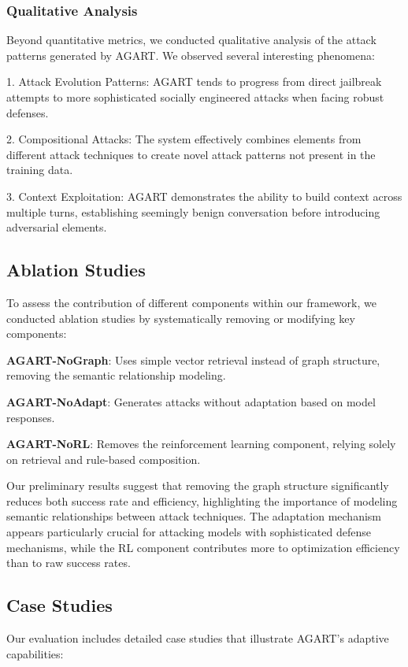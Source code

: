 \subsubsection{Qualitative Analysis}
Beyond quantitative metrics, we conducted qualitative analysis of the attack patterns generated by AGART. We observed several interesting phenomena:

1. Attack Evolution Patterns: AGART tends to progress from direct jailbreak attempts to more sophisticated socially engineered attacks when facing robust defenses.

2. Compositional Attacks: The system effectively combines elements from different attack techniques to create novel attack patterns not present in the training data.

3. Context Exploitation: AGART demonstrates the ability to build context across multiple turns, establishing seemingly benign conversation before introducing adversarial elements.

\subsection{Ablation Studies}
To assess the contribution of different components within our framework, we conducted ablation studies by systematically removing or modifying key components:

\textbf{AGART-NoGraph}: Uses simple vector retrieval instead of graph structure, removing the semantic relationship modeling.

\textbf{AGART-NoAdapt}: Generates attacks without adaptation based on model responses.

\textbf{AGART-NoRL}: Removes the reinforcement learning component, relying solely on retrieval and rule-based composition.

Our preliminary results suggest that removing the graph structure significantly reduces both success rate and efficiency, highlighting the importance of modeling semantic relationships between attack techniques. The adaptation mechanism appears particularly crucial for attacking models with sophisticated defense mechanisms, while the RL component contributes more to optimization efficiency than to raw success rates.

\subsection{Case Studies}
Our evaluation includes detailed case studies that illustrate AGART's adaptive capabilities:

